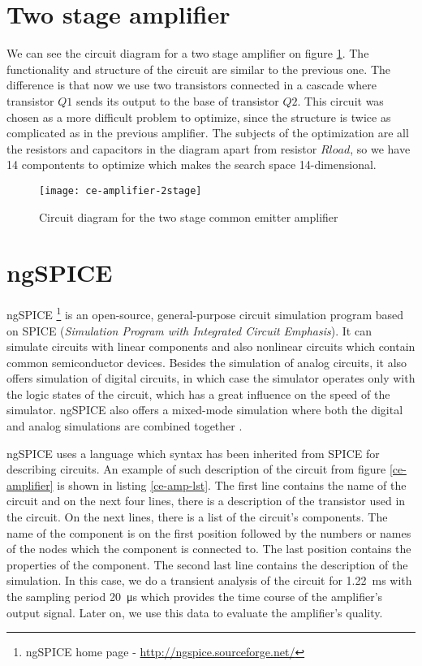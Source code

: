 \section{Two stage amplifier}
We can see the circuit diagram for a two stage amplifier on figure \ref{ce-amplifier-2stage}. The functionality and structure of the circuit are similar to the previous one. The difference is that now we use two transistors connected in a cascade where transistor $Q1$ sends its output to the base of transistor $Q2$. This circuit was chosen as a more difficult problem to optimize, since the structure is twice as complicated as in the previous amplifier. The subjects of the optimization are all the resistors and capacitors in the diagram apart from resistor $Rload$, so we have 14 compontents to optimize which makes the search space 14-dimensional.

\begin{figure}[H]
    \centering
    \texttt{[image: ce-amplifier-2stage]} \label{ce-amplifier-2stage}
    \caption{Circuit diagram for the two stage common emitter amplifier}
\end{figure}

\section{ngSPICE}
ngSPICE \footnote{ngSPICE home page - \url{http://ngspice.sourceforge.net/}} is an open-source, general-purpose circuit simulation program based on SPICE (\textit{Simulation Program with Integrated Circuit Emphasis}). It can simulate circuits with linear components and also nonlinear circuits which contain common semiconductor devices. Besides the simulation of analog circuits, it also offers simulation of digital circuits, in which case the simulator operates only with the logic states of the circuit, which has a great influence on the speed of the simulator. ngSPICE also offers a mixed-mode simulation where both the digital and analog simulations are combined together \cite{ngSPICE-manual}.

ngSPICE uses a language which syntax has been inherited from SPICE for describing circuits. An example of such description of the circuit from figure \ref{ce-amplifier} is shown in listing \ref{ce-amp-lst}. The first line contains the name of the circuit and on the next four lines, there is a description of the transistor used in the circuit. On the next lines, there is a list of the circuit's components. The name of the component is on the first position followed by the numbers or names of the nodes which the component is connected to. The last position contains the properties of the component. The second last line contains the description of the simulation. In this case, we do a transient analysis of the circuit for \SI{1.22}{\milli\second} with the sampling period \SI{20}{\micro\second} which provides the time course of the amplifier's output signal. Later on, we use this data to evaluate the amplifier's quality.

